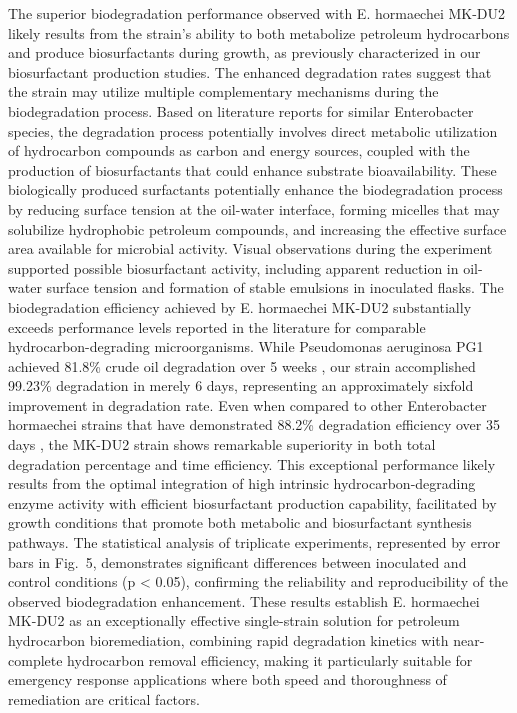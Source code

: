 \documentclass{svjour3}
\begin{document}
The superior biodegradation performance observed with E. hormaechei MK-DU2 likely results from the strain’s ability to both metabolize petroleum hydrocarbons and produce biosurfactants during growth, as previously characterized in our biosurfactant production studies. The enhanced degradation rates suggest that the strain may utilize multiple complementary mechanisms during the biodegradation process. Based on literature reports for similar Enterobacter species, the degradation process potentially involves direct metabolic utilization of hydrocarbon compounds as carbon and energy sources, coupled with the production of biosurfactants that could enhance substrate bioavailability. These biologically produced surfactants potentially enhance the biodegradation process by reducing surface tension at the oil-water interface, forming micelles that may solubilize hydrophobic petroleum compounds, and increasing the effective surface area available for microbial activity. Visual observations during the experiment supported possible biosurfactant activity, including apparent reduction in oil-water surface tension and formation of stable emulsions in inoculated flasks.
The biodegradation efficiency achieved by E. hormaechei MK-DU2 substantially exceeds performance levels reported in the literature for comparable hydrocarbon-degrading microorganisms. While Pseudomonas aeruginosa PG1 achieved 81.8\% crude oil degradation over 5 weeks \cite{31}, our strain accomplished 99.23\% degradation in merely 6 days, representing an approximately sixfold improvement in degradation rate. Even when compared to other Enterobacter hormaechei strains that have demonstrated 88.2\% degradation efficiency over 35 days \cite{54}, the MK-DU2 strain shows remarkable superiority in both total degradation percentage and time efficiency. This exceptional performance likely results from the optimal integration of high intrinsic hydrocarbon-degrading enzyme activity with efficient biosurfactant production capability, facilitated by growth conditions that promote both metabolic and biosurfactant synthesis pathways. The statistical analysis of triplicate experiments, represented by error bars in Fig.~5, demonstrates significant differences between inoculated and control conditions (p < 0.05), confirming the reliability and reproducibility of the observed biodegradation enhancement. These results establish E. hormaechei MK-DU2 as an exceptionally effective single-strain solution for petroleum hydrocarbon bioremediation, combining rapid degradation kinetics with near-complete hydrocarbon removal efficiency, making it particularly suitable for emergency response applications where both speed and thoroughness of remediation are critical factors.
\end{document}
